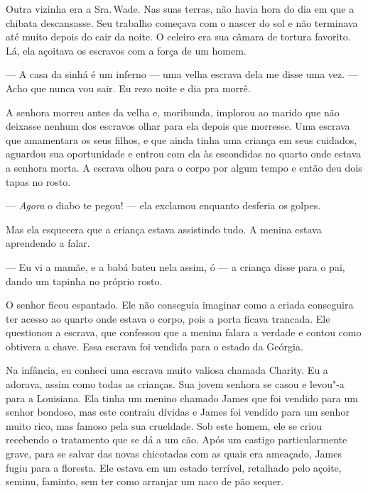 Outra vizinha era a Sra.\,Wade. Nas suas
terras, não havia hora do dia em que a chibata descansasse. Seu trabalho
começava com o nascer do sol e não terminava até muito depois do cair da
noite. O celeiro era sua câmara de tortura favorito. Lá, ela açoitava os
escravos com a força de um homem.

--- A casa da sinhá é um inferno --- uma velha escrava dela me disse uma
vez. --- Acho que nunca vou sair. Eu rezo noite e dia pra morrê.

A senhora morreu antes da velha e,
moribunda, implorou ao marido que não deixasse nenhum dos escravos olhar
para ela depois que morresse. Uma escrava que amamentara os seus filhos,
e que ainda tinha uma criança em seus cuidados, aguardou sua
oportunidade e entrou com ela às escondidas no quarto onde estava a
senhora morta. A escrava olhou para o corpo por algum tempo e então deu
dois tapas no rosto.

--- \emph{Agora} o diabo te pegou! --- ela exclamou enquanto desferia os
golpes.

Mas ela esquecera que a criança estava assistindo tudo. A menina estava
aprendendo a falar.

--- Eu vi a mamãe, e a babá bateu nela assim, ó --- a criança disse para
o pai, dando um tapinha no próprio rosto.

O senhor ficou espantado. Ele não conseguia imaginar como a criada
conseguira ter acesso ao quarto onde estava o corpo, pois a porta ficava
trancada. Ele questionou a escrava, que confessou que a menina falara a
verdade e contou como obtivera a chave. Essa escrava foi vendida para o
estado da Geórgia.

Na infância, eu conheci uma escrava
muito valiosa chamada Charity. Eu a adorava, assim como todas as
crianças. Sua jovem senhora se casou e levou"-a para a Louisiana. Ela
tinha um menino chamado James que foi vendido para um senhor bondoso,
mas este contraiu dívidas e James foi vendido para um senhor muito rico,
mas famoso pela sua crueldade. Sob este homem, ele se criou recebendo o
tratamento que se dá a um cão. Após um castigo particularmente grave,
para se salvar das novas chicotadas com as quais era ameaçado, James
fugiu para a floresta. Ele estava em um estado terrível, retalhado pelo
açoite, seminu, faminto, sem ter como arranjar um naco de pão sequer.

